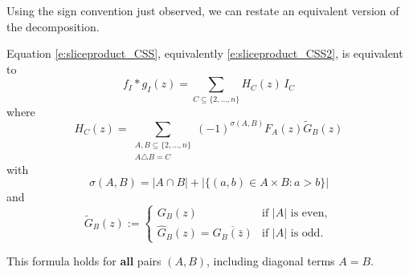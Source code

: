 \documentclass[11pt]{amsart}
\begin{document}
Using the sign convention just observed, we can restate an equivalent version of the decomposition.

\begin{prop}
Equation \eqref{e:sliceproduct_CSS}, equivalently \eqref{e:sliceproduct_CSS2}, is equivalent to
\[
f_I * g_I(z) = \sum_{C \subseteq \{2,\ldots,n\}} H_C(z) \, I_C
\]
where
\[
H_C(z) = \sum_{\substack{A, B \subseteq \{2,\ldots,n\} \\ A \triangle B = C}} (-1)^{\sigma(A,B)} F_A(z) \tilde{G}_B(z)
\]
with
\[
\sigma(A, B) = |A \cap B| + |\{(a,b) \in A \times B : a > b\}|
\]
and
\[
\tilde{G}_B(z) :=
\begin{cases}
G_B(z) & \text{if } |A| \text{ is even}, \\
\hat{G}_B(z) = \overline{G_B(\bar{z})} & \text{if } |A| \text{ is odd}.
\end{cases}
\]
\end{prop}
This formula holds for \textbf{all} pairs $(A, B)$, including diagonal terms $A = B$.
\end{document}
